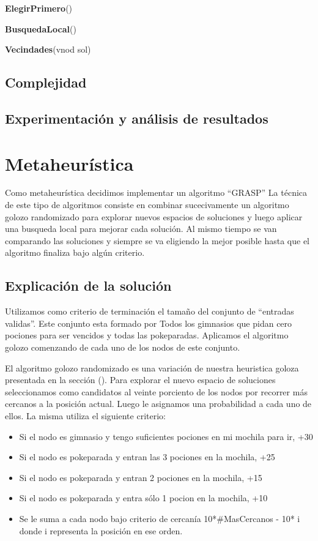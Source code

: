 \documentclass[spanish,12pt]{article}
\begin{document}
\begin{algorithm}[H]{\textbf{ElegirPrimero}()}
\begin{algorithm}[H]{\textbf{BusquedaLocal}()}
\begin{algorithm}[H]{\textbf{Vecindades}(vnod sol)}
\subsection{Complejidad}

\subsection{Experimentación y análisis de resultados}



\section{Metaheurística}

Como metaheurística decidimos implementar un algoritmo ``GRASP''
La técnica de este tipo de algoritmos consiste en combinar sucecivamente un algoritmo golozo randomizado para explorar nuevos espacios de soluciones y luego aplicar una busqueda local para mejorar cada solución. Al mismo tiempo se van comparando las soluciones y siempre se va eligiendo la mejor posible hasta que el algoritmo finaliza bajo algún criterio.

\subsection{Explicación de la solución}

Utilizamos como criterio de terminación el tamaño del conjunto de ``entradas validas''. Este conjunto esta formado por Todos los gimnasios que pidan cero pociones para ser vencidos y todas las pokeparadas. Aplicamos el algoritmo golozo comenzando de cada uno de los nodos de este conjunto. 

El algoritmo golozo randomizado es una variación de nuestra heuristica goloza presentada en la sección (). %
Para explorar el nuevo espacio de soluciones seleccionamos como candidatos al veinte porciento de los nodos por recorrer más cercanos a la posición actual.
Luego le asignamos una probabilidad a cada uno de ellos. La misma utiliza el siguiente criterio:

\begin{itemize}
	\item Si el nodo es gimnasio y tengo suficientes pociones en mi mochila para ir, +30
	\item Si el nodo es pokeparada y entran las 3 pociones en la mochila, +25
	\item Si el nodo es pokeparada y entran 2 pociones en la mochila, +15
	\item Si el nodo es pokeparada y entra sólo 1 pocion en la mochila, +10
	\item Se le suma a cada nodo  bajo criterio de cercanía 10*$\# $MasCercanos - 10* i donde i representa la posición en ese orden.
\end{itemize} 


\end{algorithm}
\end{algorithm}
\end{algorithm}
\end{document}
